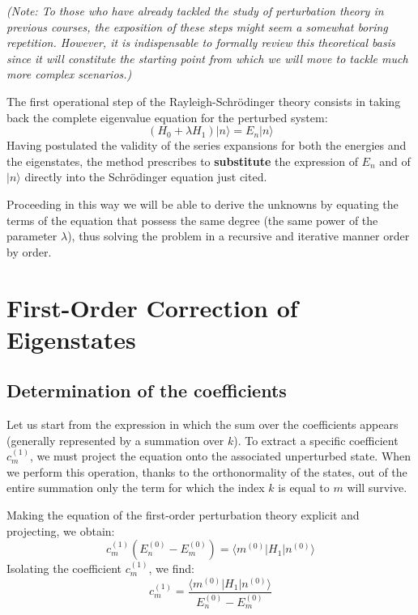 \textit{(Note: To those who have already tackled the study of perturbation theory in previous courses, the exposition of these steps might seem a somewhat boring repetition. However, it is indispensable to formally review this theoretical basis since it will constitute the starting point from which we will move to tackle much more complex scenarios.)}

The first operational step of the Rayleigh-Schrödinger theory consists in taking back the complete eigenvalue equation for the perturbed system:
\begin{equation}
(H_0 + \lambda H_1) |n\rangle = E_n |n\rangle
\end{equation}
Having postulated the validity of the series expansions for both the energies and the eigenstates, the method prescribes to \textbf{substitute} the expression of $E_n$ and of $\vert{}n\rangle$ directly into the Schrödinger equation just cited.

Proceeding in this way we will be able to derive the unknowns by equating the terms of the equation that possess the same degree (the same power of the parameter $\lambda$), thus solving the problem in a recursive and iterative manner order by order.

\section{First-Order Correction of Eigenstates}

\subsection{Determination of the coefficients}
Let us start from the expression in which the sum over the coefficients appears (generally represented by a summation over $k$). To extract a specific coefficient $c_m^{(1)}$, we must project the equation onto the associated unperturbed state. When we perform this operation, thanks to the orthonormality of the states, out of the entire summation only the term for which the index $k$ is equal to $m$ will survive.

Making the equation of the first-order perturbation theory explicit and projecting, we obtain:
\begin{equation}
c_m^{(1)} (E_n^{(0)} - E_m^{(0)}) = \langle m^{(0)} | H_1 | n^{(0)} \rangle
\end{equation}
Isolating the coefficient $c_m^{(1)}$, we find:
\begin{equation}
c_m^{(1)} = \frac{\langle m^{(0)} | H_1 | n^{(0)} \rangle}{E_n^{(0)} - E_m^{(0)}}
\end{equation}

